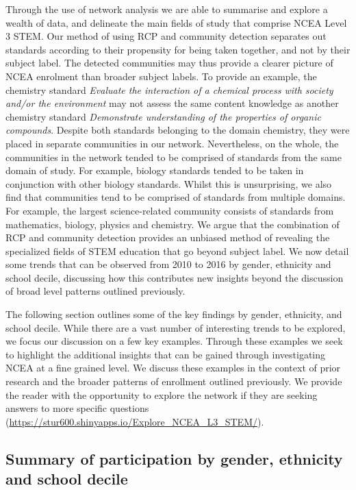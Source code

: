 Through the use of network analysis we are able to summarise and explore a wealth of data, and delineate the main fields of study that comprise NCEA Level 3 STEM. Our method of using RCP and community detection separates out standards according to their propensity for being taken together, and not by their subject label. The detected communities may thus provide a clearer picture of NCEA enrolment than broader subject labels. To provide an example, the chemistry standard \textit{Evaluate the interaction of a chemical process with society and/or the environment} may not assess the same content knowledge as another chemistry standard \textit{Demonstrate understanding of the properties of organic compounds}. Despite both standards belonging to the domain chemistry, they were placed in separate communities in our network. Nevertheless, on the whole, the communities in the network tended to be comprised of standards from the same domain of study. For example, biology standards tended to be taken in conjunction with other biology standards. Whilst this is unsurprising, we also find that communities tend to be comprised of standards from multiple domains. For example, the largest science-related community consists of standards from mathematics, biology, physics and chemistry. We argue that the combination of RCP and community detection provides an unbiased method of revealing the specialized fields of STEM education that go beyond subject label. We now detail some trends that can be observed from 2010 to 2016 by gender, ethnicity and school decile, discussing how this contributes new insights beyond the discussion of broad level patterns outlined previously.

The following section outlines some of the key findings by gender, ethnicity, and school decile. While there are a vast number of interesting trends to be explored, we focus our discussion on a few key examples. Through these examples we seek to highlight the additional insights that can be gained through investigating NCEA at a fine grained level. We discuss these examples in the context of prior research and the broader patterns of enrollment outlined previously. We provide the reader with the opportunity to explore the network if they are seeking answers to more specific questions (\url{https://stur600.shinyapps.io/Explore_NCEA_L3_STEM/}). 

\subsection*{Summary of participation by gender, ethnicity and school decile}

